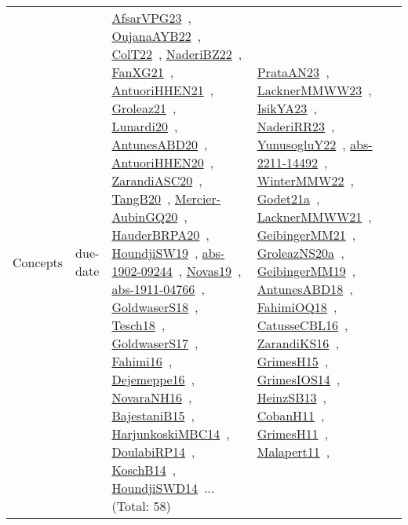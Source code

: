 {\begin{longtable}{lp{3cm}>{\raggedright\arraybackslash}p{6cm}>{\raggedright\arraybackslash}p{6cm}>{\raggedright\arraybackslash}p{8cm}}
Concepts & due-date & \href{works/AfsarVPG23.pdf}{AfsarVPG23}~\cite{AfsarVPG23}, \href{works/OujanaAYB22.pdf}{OujanaAYB22}~\cite{OujanaAYB22}, \href{works/ColT22.pdf}{ColT22}~\cite{ColT22}, \href{works/NaderiBZ22.pdf}{NaderiBZ22}~\cite{NaderiBZ22}, \href{works/FanXG21.pdf}{FanXG21}~\cite{FanXG21}, \href{works/AntuoriHHEN21.pdf}{AntuoriHHEN21}~\cite{AntuoriHHEN21}, \href{works/Groleaz21.pdf}{Groleaz21}~\cite{Groleaz21}, \href{works/Lunardi20.pdf}{Lunardi20}~\cite{Lunardi20}, \href{works/AntunesABD20.pdf}{AntunesABD20}~\cite{AntunesABD20}, \href{works/AntuoriHHEN20.pdf}{AntuoriHHEN20}~\cite{AntuoriHHEN20}, \href{works/ZarandiASC20.pdf}{ZarandiASC20}~\cite{ZarandiASC20}, \href{works/TangB20.pdf}{TangB20}~\cite{TangB20}, \href{works/Mercier-AubinGQ20.pdf}{Mercier-AubinGQ20}~\cite{Mercier-AubinGQ20}, \href{works/HauderBRPA20.pdf}{HauderBRPA20}~\cite{HauderBRPA20}, \href{works/HoundjiSW19.pdf}{HoundjiSW19}~\cite{HoundjiSW19}, \href{works/abs-1902-09244.pdf}{abs-1902-09244}~\cite{abs-1902-09244}, \href{works/Novas19.pdf}{Novas19}~\cite{Novas19}, \href{works/abs-1911-04766.pdf}{abs-1911-04766}~\cite{abs-1911-04766}, \href{works/GoldwaserS18.pdf}{GoldwaserS18}~\cite{GoldwaserS18}, \href{works/Tesch18.pdf}{Tesch18}~\cite{Tesch18}, \href{works/GoldwaserS17.pdf}{GoldwaserS17}~\cite{GoldwaserS17}, \href{works/Fahimi16.pdf}{Fahimi16}~\cite{Fahimi16}, \href{works/Dejemeppe16.pdf}{Dejemeppe16}~\cite{Dejemeppe16}, \href{works/NovaraNH16.pdf}{NovaraNH16}~\cite{NovaraNH16}, \href{works/BajestaniB15.pdf}{BajestaniB15}~\cite{BajestaniB15}, \href{works/HarjunkoskiMBC14.pdf}{HarjunkoskiMBC14}~\cite{HarjunkoskiMBC14}, \href{works/DoulabiRP14.pdf}{DoulabiRP14}~\cite{DoulabiRP14}, \href{works/KoschB14.pdf}{KoschB14}~\cite{KoschB14}, \href{works/HoundjiSWD14.pdf}{HoundjiSWD14}~\cite{HoundjiSWD14}... (Total: 58) & \href{works/PrataAN23.pdf}{PrataAN23}~\cite{PrataAN23}, \href{works/LacknerMMWW23.pdf}{LacknerMMWW23}~\cite{LacknerMMWW23}, \href{works/IsikYA23.pdf}{IsikYA23}~\cite{IsikYA23}, \href{works/NaderiRR23.pdf}{NaderiRR23}~\cite{NaderiRR23}, \href{works/YunusogluY22.pdf}{YunusogluY22}~\cite{YunusogluY22}, \href{works/abs-2211-14492.pdf}{abs-2211-14492}~\cite{abs-2211-14492}, \href{works/WinterMMW22.pdf}{WinterMMW22}~\cite{WinterMMW22}, \href{works/Godet21a.pdf}{Godet21a}~\cite{Godet21a}, \href{works/LacknerMMWW21.pdf}{LacknerMMWW21}~\cite{LacknerMMWW21}, \href{works/GeibingerMM21.pdf}{GeibingerMM21}~\cite{GeibingerMM21}, \href{works/GroleazNS20a.pdf}{GroleazNS20a}~\cite{GroleazNS20a}, \href{works/GeibingerMM19.pdf}{GeibingerMM19}~\cite{GeibingerMM19}, \href{works/AntunesABD18.pdf}{AntunesABD18}~\cite{AntunesABD18}, \href{works/FahimiOQ18.pdf}{FahimiOQ18}~\cite{FahimiOQ18}, \href{works/CatusseCBL16.pdf}{CatusseCBL16}~\cite{CatusseCBL16}, \href{works/ZarandiKS16.pdf}{ZarandiKS16}~\cite{ZarandiKS16}, \href{works/GrimesH15.pdf}{GrimesH15}~\cite{GrimesH15}, \href{works/GrimesIOS14.pdf}{GrimesIOS14}~\cite{GrimesIOS14}, \href{works/HeinzSB13.pdf}{HeinzSB13}~\cite{HeinzSB13}, \href{works/CobanH11.pdf}{CobanH11}~\cite{CobanH11}, \href{works/GrimesH11.pdf}{GrimesH11}~\cite{GrimesH11}, \href{works/Malapert11.pdf}{Malapert11}~\cite{Malapert11}, 
\end{longtable}}
